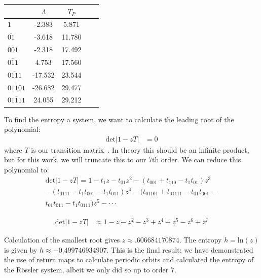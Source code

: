 \documentclass[12 pt]{article}
\begin{document}
\begin{center}
  \begin{tabular}{| l | c | c | c  | r| }
    \hline
     & $\Lambda$ & $T_P$ \\ \hline
    $\overline{1}$  & -2.383 & 5.871\\ \hline
    $\overline{01}$ &  -3.618 & 11.780 \\ \hline
    $\overline{001}$ &  -2.318 & 17.492 \\ \hline
    $\overline{011}$ & 4.753 & 17.560  \\ \hline
    $\overline{0111}$ &  -17.532 & 23.544 \\ \hline
    $\overline{01101}$ &  -26.682 & 29.477 \\ \hline
    $\overline{01111}$ & 24.055 & 29.212 \\ \hline
  \end{tabular}
  \label{Tab:Eigenvales}
\end{center}

To find the entropy a system, we want to calculate the leading root of
the polynomial:
\begin{equation}
\begin{split}
\text{det}|1-zT| &=0
\end{split}
\end{equation}
where $T$ is our transition matrix~\cite{CB}. In theory this should be an
infinite product, but for this work, we will truncate this to our 7th
order.  We can reduce this polynomial to:
\begin{equation}
\begin{split}
\text{det}|1-zT| = 1 - t_{1}z - t_{01}z^2 - (t_{001} + t_{110} - t_{1}t_{01})z^3 \\ -(t_{0111} -t_{1}t_{001}-t_{1}t_{011})z^4  -(t_{01101}+t_{01111}-t_{01}t_{001}- \\ t_{01}t_{011}-t_{1}t_{0111})z^5 - \cdot \cdot \cdot
\end{split}
\end{equation}

\begin{equation}
\begin{split}
\text{det}|1-zT| &\approx 1 - z -z^2 - z^3 +z^4+z^5-z^6+z^7
\end{split}
\end{equation}

Calculation of the smallest root gives $z \approx .606684170874$.  The
entropy $h = \text{ln}(z)$ is given by $h \approx -0.499746934907$.
This is the final result: we have demonstrated the use of return maps to
calculate periodic orbits and calculated the entropy of the R\"ossler
system, albeit we only did so up to order 7.
\end{document}
